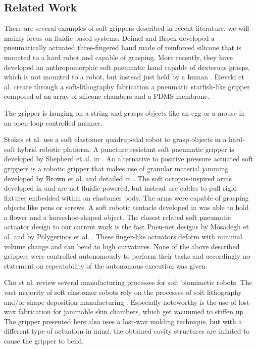 \subsection{Related Work}
There are several examples of soft grippers described in recent literature, we will mainly focus on fluidic-based systems. 
Deimel and Brock \cite{deimel2013compliant} developed a pneumatically actuated three-fingered hand made of reinforced silicone that is mounted to a hard robot and capable of grasping.
More recently, they have developed an anthropomorphic soft pneumatic hand capable of dexterous grasps, which is not mounted to a robot, but instead just held by a human \cite{deimel2014novel}. 
Ilievski et al. \cite{ilievski2011soft} create through a soft-lithography fabrication a pneumatic starfish-like gripper composed of an array of silicone chambers and a PDMS membrane. 

The gripper is hanging on a string and grasps objects like an egg or a mouse in an open-loop controlled manner.
 
Stokes et al. \cite{Stokes2014hybrid} use a soft elastomer quadrupedal robot to grasp objects in a hard-soft hybrid robotic platform. 
A puncture resistant soft pneumatic gripper is developed by Shepherd et al. in \cite{shepherd2013soft}. 
An alternative to positive pressure actuated soft grippers is a robotic gripper that makes use of granular material jamming developed by Brown et al. and detailed in \cite{brown2010universal}.
The soft octopus-inspired arms developed in \cite{calisti2010study} and \cite{calisti2011octopus} are not fluidic powered, but instead use cables to pull rigid fixtures embedded within an elastomer body. 
The arms were capable of grasping objects like pens or screws.
A soft robotic tentacle developed in \cite{martinez2013robotic} was able to hold a flower and a horseshoe-shaped object.
The closest related soft pneumatic actuator design to our current work is the fast Pneu-net designs by Mosadegh et al. \cite{mosadegh2014pneumatic} and by Polygerinos et al. \cite{polygerinos2013towards}.
These finger-like actuators deform with minimal volume change and can bend to high curvatures.
None of the above described grippers were controlled autonomously to perform their tasks and accordingly no statement on repeatability of the autonomous execution was given. 

Cho et al. \cite{cho2009review} review several manufacturing processes for soft biomimetic robots. 
The vast majority of soft elastomer robots rely on the processes of soft lithography \cite{xia1998soft} and/or shape deposition manufacturing \cite{cham2002fast}. 
Especially noteworthy is the use of lost-wax fabrication for jammable skin chambers, which get vacuumed to stiffen up \cite{steltz2009soft}. 
The gripper presented here also uses a lost-wax molding technique, but with a different type of actuation in mind: the obtained cavity structures are inflated to cause the gripper to bend.

